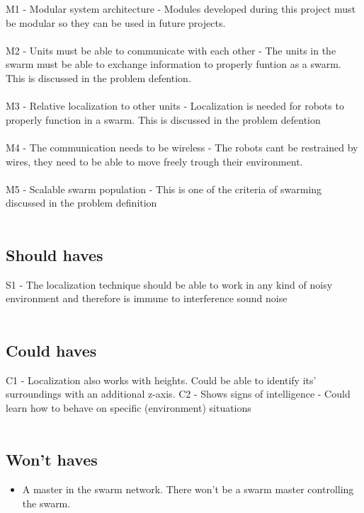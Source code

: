\documentclass[10pt,a4paper]{article}
\begin{document}
M1 - Modular system architecture - Modules developed during this project must be modular so they can be used in future projects.\\\\
M2 - Units must be able to communicate with each other - The units in the swarm must be able to exchange information to properly funtion as a swarm. This is discussed in the problem defention\cite{multidomaincom}.  \\\\
M3 - Relative localization to other units - Localization is needed for robots to properly function in a swarm. This is discussed in the problem defention\cite{multidomaincom}\\\\
M4 - The communication needs to be wireless - The robots cant be restrained by wires, they need to be able to move freely trough their environment.\\\\
M5 - Scalable swarm population - This is one of the criteria of swarming discussed in the problem definition\\\\


\subsection{Should haves}

S1 - The localization technique should be able to work in any kind of noisy environment and therefore is immune to interference sound noise\\\\


\subsection{Could haves}

C1 - Localization also works with heights. Could be able to identify its' surroundings with an additional z-axis.
C2 - Shows signs of intelligence - Could learn how to behave on specific (environment) situations\\\\




\subsection{Won't haves}
\begin{itemize}
\item A master in the swarm network. There won't be a swarm master controlling the swarm.
\end{itemize}
\end{document}
